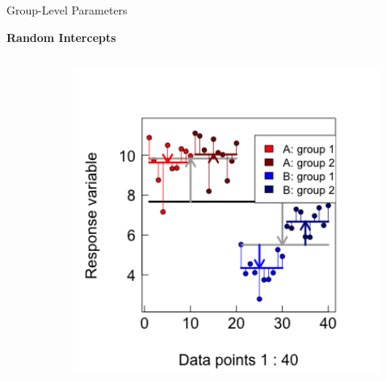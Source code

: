 \documentclass{beamer}
\begin{document}
\begin{frame}{Group-Level Parameters}

\textbf{Random Intercepts}

\begin{columns}[onlytextwidth] 
  \begin{column}{0.5\textwidth}
      \scalebox{0.85}{
      
      }    
      \end{column}
    \hspace{0.02\textwidth} %
    \begin{column}{0.5\textwidth}
      \begin{center}
        \includegraphics[width=0.9\textwidth]{lectures/day_1_intro_to_mems/figures/unnamed-chunk-36-1.png}
      \end{center}
    \end{column}
  \end{columns}
  

\end{frame}
\end{document}
